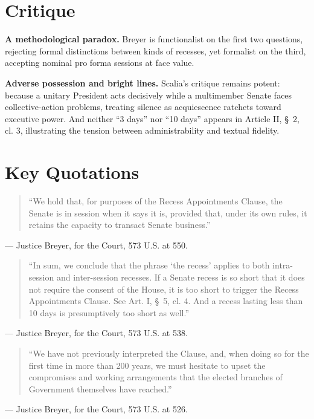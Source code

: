 \documentclass[12pt]{article}
\begin{document}
\section{Critique}

\textbf{A methodological paradox.} Breyer is functionalist on the first two questions, rejecting formal distinctions between kinds of recesses, yet formalist on the third, accepting nominal pro forma sessions at face value.

\textbf{Adverse possession and bright lines.} Scalia's critique remains potent: because a unitary President acts decisively while a multimember Senate faces collective-action problems, treating silence as acquiescence ratchets toward executive power. And neither ``3 days'' nor ``10 days'' appears in Article II, \S~2, cl. 3, illustrating the tension between administrability and textual fidelity.

\section{Key Quotations}

\begin{quote}
``We hold that, for purposes of the Recess Appointments Clause, the Senate is in session when it says it is, provided that, under its own rules, it retains the capacity to transact Senate business.''
\end{quote}
\noindent --- Justice Breyer, for the Court, 573 U.S. at 550.

\begin{quote}
``In sum, we conclude that the phrase `the recess' applies to both intra-session and inter-session recesses. If a Senate recess is so short that it does not require the consent of the House, it is too short to trigger the Recess Appointments Clause. See Art. I, \S~5, cl. 4. And a recess lasting less than 10 days is presumptively too short as well.''
\end{quote}
\noindent --- Justice Breyer, for the Court, 573 U.S. at 538.

\begin{quote}
``We have not previously interpreted the Clause, and, when doing so for the first time in more than 200 years, we must hesitate to upset the compromises and working arrangements that the elected branches of Government themselves have reached.''
\end{quote}
\noindent --- Justice Breyer, for the Court, 573 U.S. at 526.
\end{document}
